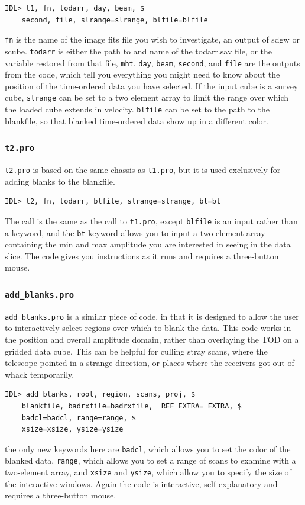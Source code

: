 \documentclass[11pt]{article}
\begin{document}
{\begin{verbatim}
IDL> t1, fn, todarr, day, beam, $
	second, file, slrange=slrange, blfile=blfile
\end{verbatim}
\texttt{fn} is the name of the image fits file you wish to investigate, an output of sdgw or scube. \texttt{todarr} is either the path to and name of the todarr.sav file, or the variable restored from that file, \texttt{mht}. \texttt{day}, \texttt{beam}, \texttt{second}, and \texttt{file} are the outputs from the code, which tell you everything you might need to know about the position of the time-ordered data you have selected. If the input cube is a survey cube, \texttt{slrange} can be set to a two element array to limit the range over which the loaded cube extends in velocity. \texttt{blfile} can be set to the path to the blankfile, so that blanked time-ordered data show up in a different color.  

\subsubsection{\texttt{t2.pro}}
\texttt{t2.pro} is based on the same chassis as \texttt{t1.pro}, but it is used exclusively for adding blanks to the blankfile.
\begin{verbatim}
IDL> t2, fn, todarr, blfile, slrange=slrange, bt=bt
\end{verbatim}
The call is the same as the call to \texttt{t1.pro}, except \texttt{blfile} is an input rather than a keyword, and the \texttt{bt} keyword allows you to input a two-element array containing the min and max amplitude you are interested in seeing in the data slice. The code gives you instructions as it runs and requires a three-button mouse.

\subsubsection{\texttt{add\_blanks.pro}}
\texttt{add\_blanks.pro} is a similar piece of code, in that it is designed to allow the user to interactively select regions over which to blank the data. This code works in the position and overall amplitude domain, rather than overlaying the TOD on a gridded data cube. This can be helpful for culling stray scans, where the telescope pointed in a strange direction, or places where the receivers got out-of-whack temporarily. 
\begin{verbatim}
IDL> add_blanks, root, region, scans, proj, $
	blankfile, badrxfile=badrxfile, _REF_EXTRA=_EXTRA, $
	badcl=badcl, range=range, $
	xsize=xsize, ysize=ysize
\end{verbatim}
the only new keywords here are \texttt{badcl}, which allows you to set the color of the blanked data, \texttt{range}, which allows you to set a range of scans to examine with a two-element array, and \texttt{xsize} and \texttt{ysize}, which allow you to specify the size of the interactive windows. Again the code is interactive, self-explanatory and requires a three-button mouse.

}
\end{document}
